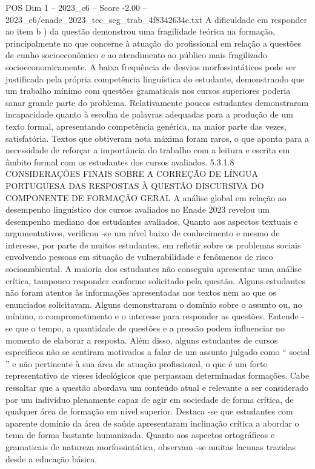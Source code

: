 \begin{textsample}{POS Dim 1 – 2023\_c6 – Score -2.00 – 2023\_c6/enade\_2023\_tec\_seg\_trab\_4f8342634e.txt}
A dificuldade em responder ao item b ) da questão demonstrou uma fragilidade teórica na formação, principalmente no que concerne à atuação do profissional em relação a questões de cunho socioeconômico e ao atendimento ao público mais fragilizado socioeconomicamente.
A baixa frequência de desvios morfossintáticos pode ser justificada pela própria competência linguística do estudante, demonstrando que um trabalho mínimo com questões gramaticais nos cursos superiores poderia sanar grande parte do problema.
Relativamente poucos estudantes demonstraram incapacidade quanto à escolha de palavras adequadas para a produção de um texto formal, apresentando competência genérica, na maior parte das vezes, satisfatória.
Textos que obtiveram nota máxima foram raros, o que aponta para a necessidade de reforçar a importância do trabalho com a leitura e escrita em âmbito formal com os estudantes dos cursos avaliados. 5.3.1.8 CONSIDERAÇÕES FINAIS SOBRE A CORREÇÃO DE LÍNGUA PORTUGUESA DAS RESPOSTAS À QUESTÃO DISCURSIVA DO COMPONENTE DE FORMAÇÃO GERAL A análise global em relação ao desempenho linguístico dos cursos avaliados no Enade 2023 revelou um desempenho mediano dos estudantes avaliados.
Quanto aos aspectos textuais e argumentativos, verificou -se um nível baixo de conhecimento e mesmo de interesse, por parte de muitos estudantes, em refletir sobre os problemas sociais envolvendo pessoas em situação de vulnerabilidade e fenômenos de risco socioambiental.
A maioria dos estudantes não conseguiu apresentar uma análise crítica, tampouco responder conforme solicitado pela questão.
Alguns estudantes não foram atentos às informações apresentadas nos textos nem ao que os enunciados solicitavam.
Alguns demonstraram o domínio sobre o assunto ou, no mínimo, o comprometimento e o interesse para responder as questões.
Entende -se que o tempo, a quantidade de questões e a pressão podem influenciar no momento de elaborar a resposta.
Além disso, alguns estudantes de cursos específicos não se sentiram motivados a falar de um assunto julgado como “ social ” e não pertinente à sua área de atuação profissional, o que é um forte representativo de vieses ideológicos que perpassam determinadas formações.
Cabe ressaltar que a questão abordava um conteúdo atual e relevante a ser considerado por um indivíduo plenamente capaz de agir em sociedade de forma crítica, de qualquer área de formação em nível superior.
Destaca -se que estudantes com aparente domínio da área de saúde apresentaram inclinação crítica a abordar o tema de forma bastante humanizada.
Quanto aos aspectos ortográficos e gramaticais de natureza morfossintática, observam -se muitas lacunas trazidas desde a educação básica.

\end{textsample}
